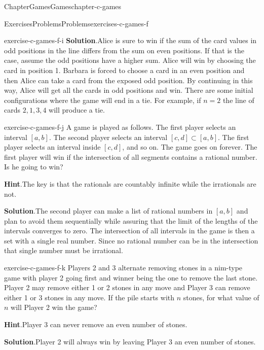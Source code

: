 \documentclass[oneside,10pt,]{book}
\newcommand{\blocktitlefont}{\relax}
\numberwithin{equation}{section}
\begin{document}
\begin{chapterptx}{Chapter}{Games}{}{Games}{}{}{chapter-c-games}
\begin{exercises-section}{Exercises}{Problems}{}{Problems}{}{}{exercises-c-games-f}
\begin{divisionexercise}{8}{}{}{exercise-c-games-f-i}
\noindent\textbf{\blocktitlefont Solution}.\hypertarget{solution-c-games-f-i-b}{}\quad{}Alice is sure to win if the sum of the card values in odd positions in the line differs from the sum on even positions. If that is the case, assume the odd positions have a higher sum.  Alice will win by choosing the card in position 1.  Barbara is forced to choose a card in an even position and then Alice can take a card from the exposed odd position.  By continuing in this way, Alice will get all the cards in odd positions and win.  There are some initial configurations where the game will end in a tie.  For example, if \(n=2\) the line of cards \(2,1,3,4\) will produce a tie.%
\end{divisionexercise}%
\begin{divisionexercise}{9}{}{}{exercise-c-games-f-j}%
A game is played as follows. The first player selects an interval \([a, b]\). The second player selects an interval \([c, d] \subset  [a, b]\). The first player selects an interval inside \([c, d]\), and so on. The game goes on forever. The first player will win if the intersection of all segments contains a rational number. Is he going to win?%
\par\smallskip%
\noindent\textbf{\blocktitlefont Hint}.\hypertarget{hint-c-games-f-j-b}{}\quad{}The key is that the rationals are countably infinite while the irrationals are not.%
\par\smallskip%
\noindent\textbf{\blocktitlefont Solution}.\hypertarget{solution-c-games-f-j-c}{}\quad{}The second player can make a list of rational numbers in \([a,b]\) and plan to avoid them sequentially while assuring that the limit of the lengths of the intervals converges to zero.  The intersection of all intervals in the game is then a set with a single real number.  Since no rational number can be in the intersection that single number must be irrational.%
\end{divisionexercise}%
\begin{divisionexercise}{10}{}{}{exercise-c-games-f-k}%
Players 2 and 3 alternate removing stones in a nim-type game with player 2 going first and winner being the one to remove the last stone. Player 2 may remove either 1 or 2 stones in any move and Player 3 can remove either 1 or 3 stones in any move.  If the pile starts with \(n\) stones, for what value of \(n\) will Player 2 win the game?%
\par\smallskip%
\noindent\textbf{\blocktitlefont Hint}.\hypertarget{hint-c-games-f-k-b}{}\quad{}Player 3 can never remove an even number of stones.%
\par\smallskip%
\noindent\textbf{\blocktitlefont Solution}.\hypertarget{solution-c-games-f-k-c}{}\quad{}Player 2 will always win by leaving Player 3 an even number of stones.%
\end{divisionexercise}%
\end{exercises-section}
\end{chapterptx}
\end{document}
